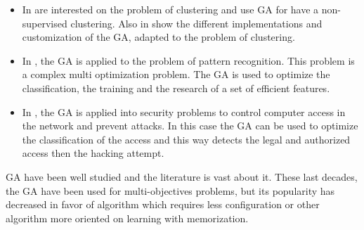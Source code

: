 
\begin{itemize}

\item In \cite{117*sheikh2008} are interested on the problem of clustering and use GA for have a non-supervised clustering. Also in  \cite{117*sheikh2008} show the different implementations and customization of the GA, adapted to the  problem of clustering.
\item In \cite{122*wang1996}, the GA is applied to the problem of pattern recognition. This problem is a complex multi optimization problem. The GA is used to optimize the classification, the training and the research of a set of efficient features. 
\item In \cite{ 123*owais2008}, the GA is applied into security problems to control computer access in the network and prevent attacks. In this case the GA can be used to optimize the classification of the access and this way detects the legal and authorized access then the hacking attempt.   
 
\end{itemize}

GA have been well studied  and the literature is vast about it. These last decades, the GA  have been used for multi-objectives problems, but its popularity has decreased in favor of algorithm which requires less configuration or other algorithm  more oriented on learning with memorization.  

